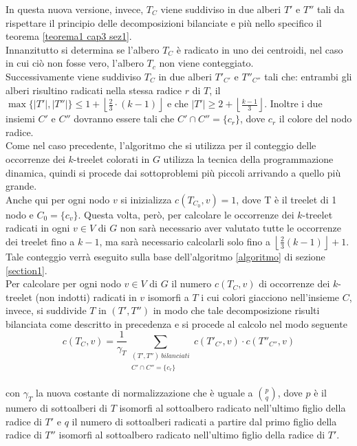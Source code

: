 In questa nuova versione, invece, $ T_C $ viene suddiviso in due alberi $ T' $ e $ T'' $ tali da  rispettare il principio delle decomposizioni bilanciate e pi\`u nello specifico il teorema \ref{teorema1 cap3 sez1}.\\
Innanzitutto si determina se l'albero $ T_C $ \`e radicato in uno dei centroidi, nel caso in cui ci\`o non fosse vero, l'albero $ T_c $ non viene conteggiato.\\
Successivamente viene suddiviso $ T_C $ in due alberi $ T'_{C'} $ e $ T''_{C''} $ tali che: entrambi gli alberi risultino radicati nella stessa radice $ r $ di $ T $, il $ \max\{|T'|,|T''|\} \le 1 + \left\lfloor \frac{2}{3} \cdot (k-1) \right\rfloor $ e che $ |T'| \ge 2+\left\lfloor\frac{k-1}{3} \right\rfloor $.
Inoltre i due insiemi $ C' $ e $ C'' $ dovranno essere tali che $ C' \cap C'' = \{c_r\} $, dove $ c_r $ il colore del nodo radice.\\
Come nel caso precedente, l'algoritmo che si utilizza per il conteggio delle occorrenze dei $ k $-treelet colorati in $ G $ utilizza la tecnica della programmazione dinamica, quindi si procede dai sottoproblemi pi\`u piccoli arrivando a quello pi\`u grande.\\
Anche qui per ogni nodo $ v $ si inizializza $ c(T_{C_0} , v) = 1 $, dove T \`e il treelet di 1 nodo e $ C_0 = \{c_v\} $.
Questa volta, per\`o, per calcolare le occorrenze dei $ k $-treelet radicati in ogni $ v \in V $ di $ G $ non sar\`a necessario aver valutato tutte le occorrenze dei treelet fino a $ k-1 $, ma sar\`a necessario calcolarli solo fino a $ \left\lfloor \frac{2}{3}(k-1)\right\rfloor +1 $.
Tale conteggio verr\`a eseguito sulla base dell'algoritmo \ref{algoritmo} di sezione \ref{section1}. \\
Per calcolare per ogni nodo $v \in V  $ di $ G $ il numero $ c(T_C,v) $ di occorrenze dei $ k $-treelet (non indotti) radicati in $ v $ isomorfi a $ T $ i cui colori giacciono nell'insieme $ C $, invece, si suddivide $ T $ in $ (T',T'') $ in modo che tale decomposizione risulti bilanciata come descritto in precedenza e si procede al calcolo nel modo seguente\\
\[c(T_C,v) = \frac{1}{\gamma_T}\sum_{\substack{{(T',T'') \ bilanciati}\\{C' \cap C'' = \{c_r\}}}} c(T'_{C'},v)\cdot c(T''_{C''},v) \] \\
con $\gamma_T$ la nuova costante di normalizzazione che \`e uguale a $ \binom{p}{q} $, dove $ p  $ \`e il numero di sottoalberi di $ T $ isomorfi al sottoalbero radicato nell'ultimo figlio della radice di $ T' $ e $ q $ il numero di sottoalberi radicati a partire dal primo figlio della radice di $ T'' $ isomorfi al sottoalbero radicato nell'ultimo figlio della radice di $ T' $.
